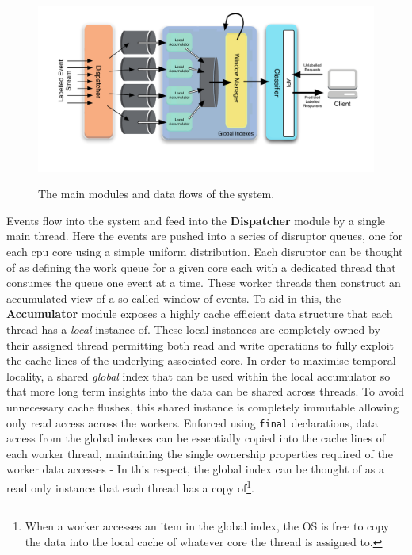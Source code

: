 \documentclass[a4paper,11pt]{scrreprt}
\begin{document}
\begin{figure}[h!]
\centering
\caption{The main modules and data flows of the system.}
\includegraphics[scale=0.72, trim=35 50 0 13, clip=true] {architectureoverview.pdf}
\label{fig:architectureoverview}
\end{figure}
Events flow into the system and feed into the \textbf{Dispatcher} module by a single main thread. Here the events are pushed into a series of disruptor queues, one for each \acrshort{cpu} core using a simple uniform distribution. Each disruptor can be thought of as defining the work queue for a given core each with a dedicated thread that consumes the queue one event at a time. These worker threads then construct an accumulated view of a so called window of events. To aid in this, the \textbf{Accumulator} module exposes a highly cache efficient data structure that each thread has a \textit{local} instance of. These local instances are completely owned by their assigned thread permitting both read and write operations to fully exploit the cache-lines of the underlying associated core. In order to maximise temporal locality, a shared \textit{global} index that can be used within the local accumulator so that more long term insights into the data can be shared across threads. To avoid unnecessary cache flushes, this shared instance is completely immutable allowing only read access across the workers. Enforced using \texttt{final} declarations, data access from the global indexes can be essentially copied into the cache lines of each worker thread, maintaining the single ownership properties required of the worker data accesses - In this respect, the global index can be thought of as a read only instance that each thread has a copy of\footnote{When a worker accesses an item in the global index, the OS is free to copy the data into the local cache of whatever core the thread is assigned to.}.
\end{document}
